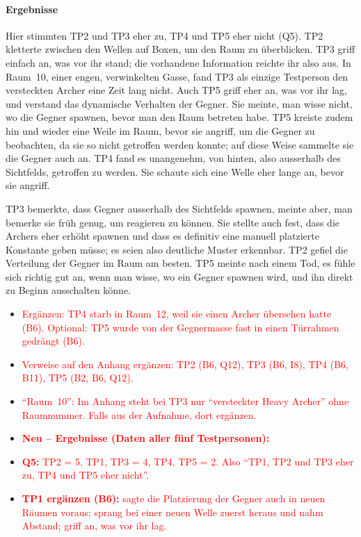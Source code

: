 \documentclass[../Main.tex]{subfiles}
\begin{document}
\paragraph{Ergebnisse}
Hier stimmten TP2 und TP3 eher zu, TP4 und TP5 eher nicht (Q5). TP2 kletterte zwischen den Wellen auf Boxen, um den Raum zu überblicken. TP3 griff einfach an, was vor ihr stand; die vorhandene Information reichte ihr also aus. In Raum~10, einer engen, verwinkelten Gasse, fand TP3 als einzige Testperson den versteckten Archer eine Zeit lang nicht. Auch TP5 griff eher an, was vor ihr lag, und verstand das dynamische Verhalten der Gegner. Sie meinte, man wisse nicht, wo die Gegner spawnen, bevor man den Raum betreten habe. TP5 kreiste zudem hin und wieder eine Weile im Raum, bevor sie angriff, um die Gegner zu beobachten, da sie so nicht getroffen werden konnte; auf diese Weise sammelte sie die Gegner auch an. TP4 fand es unangenehm, von hinten, also ausserhalb des Sichtfelds, getroffen zu werden. Sie schaute sich eine Welle eher lange an, bevor sie angriff.

TP3 bemerkte, dass Gegner ausserhalb des Sichtfelds spawnen, meinte aber, man bemerke sie früh genug, um reagieren zu können. Sie stellte auch fest, dass die Archers eher erhöht spawnen und dass es definitiv eine manuell platzierte Konstante geben müsse; es seien also deutliche Muster erkennbar. TP2 gefiel die Verteilung der Gegner im Raum am besten. TP5 meinte nach einem Tod, es fühle sich richtig gut an, wenn man wisse, wo ein Gegner spawnen wird, und ihn direkt zu Beginn ausschalten könne.

\begin{itemize}[leftmargin=1.5cm]
    \item \textcolor{red}{Ergänzen: TP4 starb in Raum~12, weil sie einen Archer übersehen hatte (B6). Optional: TP5 wurde von der Gegnermasse fast in einen Türrahmen gedrängt (B6).}
    \item \textcolor{red}{Verweise auf den Anhang ergänzen: TP2 (B6, Q12), TP3 (B6, I8), TP4 (B6, B11), TP5 (B2, B6, Q12).}
    \item \textcolor{red}{\enquote{Raum~10}: Im Anhang steht bei TP3 nur \enquote{versteckter Heavy Archer} ohne Raumnummer. Falls aus der Aufnahme, dort ergänzen.}
\end{itemize}

\begin{itemize}[leftmargin=1.5cm]
    \item \textcolor{red}{\textbf{Neu -- Ergebnisse (Daten aller fünf Testpersonen):}}
    \item \textcolor{red}{\textbf{Q5:} TP2 = 5, TP1, TP3 = 4, TP4, TP5 = 2. Also \enquote{TP1, TP2 und TP3 eher zu, TP4 und TP5 eher nicht}.}
    \item \textcolor{red}{\textbf{TP1 ergänzen (B6):} sagte die Platzierung der Gegner auch in neuen Räumen voraus; sprang bei einer neuen Welle zuerst heraus und nahm Abstand; griff an, was vor ihr lag.}
\end{itemize}
\end{document}
